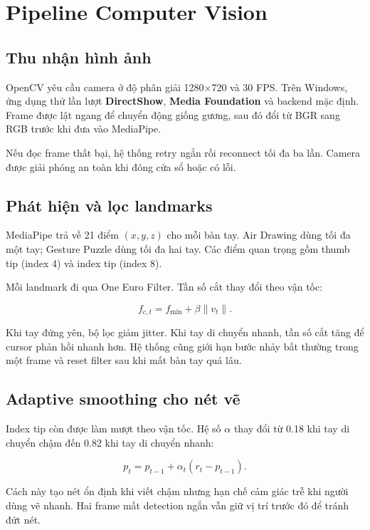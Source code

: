 \documentclass[12pt,a4paper]{article}
\begin{document}
\section{Pipeline Computer Vision}

\subsection{Thu nhận hình ảnh}

OpenCV yêu cầu camera ở độ phân giải 1280$\times$720 và 30 FPS. Trên Windows,
ứng dụng thử lần lượt \textbf{DirectShow}, \textbf{Media Foundation} và backend
mặc định. Frame được lật ngang để chuyển động giống gương, sau đó đổi từ BGR
sang RGB trước khi đưa vào MediaPipe.

Nếu đọc frame thất bại, hệ thống retry ngắn rồi reconnect tối đa ba lần. Camera
được giải phóng an toàn khi đóng cửa sổ hoặc có lỗi.

\subsection{Phát hiện và lọc landmarks}

MediaPipe trả về 21 điểm $(x,y,z)$ cho mỗi bàn tay. Air Drawing dùng tối đa một
tay; Gesture Puzzle dùng tối đa hai tay. Các điểm quan trọng gồm thumb tip
(index 4) và index tip (index 8).

Mỗi landmark đi qua One Euro Filter. Tần số cắt thay đổi theo vận tốc:

\begin{equation}
f_{c,t}=f_{\min}+\beta\lVert v_t\rVert .
\end{equation}

Khi tay đứng yên, bộ lọc giảm jitter. Khi tay di chuyển nhanh, tần số cắt tăng
để cursor phản hồi nhanh hơn. Hệ thống cũng giới hạn bước nhảy bất thường trong
một frame và reset filter sau khi mất bàn tay quá lâu.

\subsection{Adaptive smoothing cho nét vẽ}

Index tip còn được làm mượt theo vận tốc. Hệ số $\alpha$ thay đổi từ 0.18 khi
tay di chuyển chậm đến 0.82 khi tay di chuyển nhanh:

\begin{equation}
p_t=p_{t-1}+\alpha_t(r_t-p_{t-1}).
\end{equation}

Cách này tạo nét ổn định khi viết chậm nhưng hạn chế cảm giác trễ khi người dùng
vẽ nhanh. Hai frame mất detection ngắn vẫn giữ vị trí trước đó để tránh đứt nét.
\end{document}
